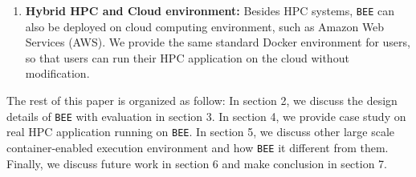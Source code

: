 \begin{enumerate}
\item \textbf{Hybrid HPC and Cloud environment:}
Besides HPC systems, \texttt{BEE} can also be deployed on cloud computing environment, such as Amazon Web Services (AWS). We provide the same standard Docker environment for users, so that users can run their HPC application on the cloud without modification.


\end{enumerate}

The rest of this paper is organized as follow: In section 2, we discuss the design details of \texttt{BEE} with evaluation in section 3. In section 4, we provide case study on real HPC application running on \texttt{BEE}. In section 5, we discuss other large scale container-enabled execution environment and how \texttt{BEE} it different from them. Finally, we discuss future work in section 6 and make conclusion in section 7.





